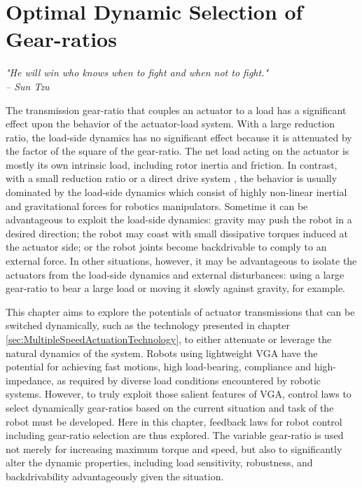 \chapter{Optimal Dynamic Selection of Gear-ratios}  %
\label{sec:ControlAndPlanningOfRobotUsingVariableGearRatioActuators}


\begin{flushright}
\textit{"He will win who knows when to fight and when not to fight."} \\ \emph{-- Sun Tzu}
\end{flushright}
\vspace{10pt}


The transmission gear-ratio that couples an actuator to a load has a significant effect upon the behavior of the actuator-load system. With a large reduction ratio, the load-side dynamics has no significant effect because it is attenuated by the factor of the square of the gear-ratio. The net load acting on the actuator is mostly its own intrinsic load, including rotor inertia and friction. In contrast, with a small reduction ratio or a direct drive system \cite{asada_direct-drive_1987}, the behavior is usually dominated by the load-side dynamics which consist of highly non-linear inertial and gravitational forces for robotics manipulators. Sometime it can be advantageous to exploit the load-side dynamics: gravity may push the robot in a desired direction; the robot may coast with small dissipative torques induced at the actuator side; or the robot joints become backdrivable to comply to an external force. In other situations, however, it may be advantageous to isolate the actuators from the load-side dynamics and external disturbances: using a large gear-ratio to bear a large load or moving it slowly against gravity, for example.

This chapter aims to explore the potentials of actuator transmissions that can be switched dynamically, such as the technology presented in chapter \ref{sec:MultipleSpeedActuationTechnology}, to either attenuate or leverage the natural dynamics of the system. Robots using lightweight VGA have the potential for achieving fast motions, high load-bearing, compliance and high-impedance, as required by diverse load conditions encountered by robotic systems. However, to truly exploit those salient features of VGA, control laws to select dynamically gear-ratios based on the current situation and task of the robot must be developed. Here in this chapter, feedback laws for robot control including gear-ratio selection are thus explored. The variable gear-ratio is used not merely for increasing maximum torque and speed, but also to significantly alter the dynamic properties, including load sensitivity, robustness, and backdrivability advantageously given the situation.

